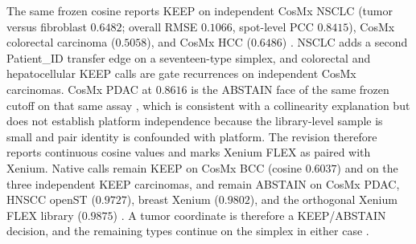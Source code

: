 The same frozen cosine reports KEEP on independent CosMx NSCLC (tumor versus fibroblast \(0.6482\); overall RMSE \(0.1066\), spot-level PCC \(0.8415\)), CosMx colorectal carcinoma (\(0.5058\)), and CosMx HCC (\(0.6486\)) \citep{He2022,Crowell2025preprint,Sun2025spatial}. NSCLC adds a second Patient\_ID transfer edge on a seventeen-type simplex, and colorectal and hepatocellular KEEP calls are gate recurrences on independent CosMx carcinomas. CosMx PDAC at \(0.8616\) is the ABSTAIN face of the same frozen cutoff on that same assay \citep{Pei2025}, which is consistent with a collinearity explanation but does not establish platform independence because the library-level sample is small and pair identity is confounded with platform. The revision therefore reports continuous cosine values and marks Xenium FLEX as paired with Xenium. Native calls remain KEEP on CosMx BCC (cosine \(0.6037\)) and on the three independent KEEP carcinomas, and remain ABSTAIN on CosMx PDAC, HNSCC openST (\(0.9727\)), breast Xenium (\(0.9802\)), and the orthogonal Xenium FLEX library (\(0.9875\)) \citep{Schott2024,Janesick2023,Pei2025}. A tumor coordinate is therefore a KEEP/ABSTAIN decision, and the remaining types continue on the simplex in either case \citep{Kiselev2018,deKanter2019,Danaher2022}.

